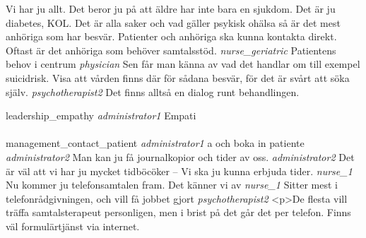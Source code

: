 \documentclass[12pt,a4paper,oneside]{article}
\begin{document}
Vi har ju allt. Det beror ju på att äldre har inte bara en sjukdom. Det är ju diabetes, KOL. Det är alla saker och vad gäller psykisk ohälsa så är det mest anhöriga som har besvär. Patienter och anhöriga ska kunna kontakta direkt. Oftast är det anhöriga som behöver samtalsstöd.  %
 {\it nurse\_geriatric %
} 
Patientens behov i centrum %
 {\it physician %
} 
Sen får man känna av vad det handlar om till exempel suicidrisk. Visa att vården finns där för sådana besvär, för det är svårt att söka själv. %
 {\it psychotherapist2 %
} 
Det finns alltså en dialog runt behandlingen. %

leadership\_empathy %
 {\it administrator1 %
} 
Empati %
\\
\\
management\_contact\_patient %
 {\it  administrator1 %
} 
a och boka in patiente %
 {\it administrator2 %
} 
Man kan ju få journalkopior och tider av oss. %
 {\it administrator2 %
} 
Det är väl att vi har ju mycket tidböcöker -- Vi ska ju kunna erbjuda tider.  %
 {\it nurse\_1 %
} 
Nu kommer ju telefonsamtalen fram. Det känner vi av %
 {\it nurse\_1 %
} 
Sitter mest i telefonrådgivningen, och vill få jobbet gjort %
 {\it psychotherapist2 %
} 
<p>De flesta vill träffa samtalsterapeut personligen, men i brist på det går det per telefon. Finns väl formulärtjänst via internet.  %
\\
\\
\end{document}
